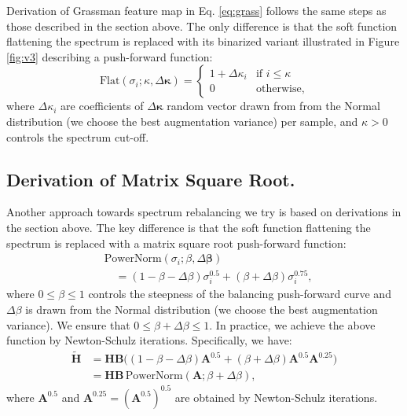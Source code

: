 Derivation of Grassman feature map in Eq. \eqref{eq:grass} follows the same steps as those described in the  section above. The only difference is that the soft function flattening the spectrum is replaced with its  binarized variant illustrated in Figure \ref{fig:v3} describing a push-forward function:
\begin{equation}
  \text{Flat}(\sigma_i; \kappa, \Delta\boldsymbol{\kappa})=
    \begin{cases}
      1+\Delta\kappa_i & \text{if $i\leq\kappa$}\\
      0 & \text{otherwise},
    \end{cases}
\end{equation}
%
where $\Delta\kappa_i$ are coefficients of $\Delta\boldsymbol{\kappa}$ random vector drawn from from the Normal distribution (we choose the best augmentation variance) per sample, and $\kappa>0$ controls the spectrum cut-off.
%



\subsection{Derivation of Matrix Square Root.}
\label{sec:pnnoise}
Another approach towards spectrum rebalancing we try is based on derivations in the   section above. The key difference is that the soft function flattening the spectrum is replaced with a matrix square root push-forward function:
\begin{align}
  &\text{PowerNorm}(\sigma_i; \beta, \Delta\boldsymbol{\beta})\nonumber\\
  &\quad=(1-\beta-\Delta{\beta})\sigma_i^{0.5}+(\beta+\Delta{\beta})\sigma_i^{0.75},
\end{align}
%
where $0\leq\beta\leq 1$ controls the steepness of the balancing push-forward curve and $\Delta{\beta}$ is %
drawn from the Normal distribution (we choose the best augmentation variance). %
We ensure that $0\leq\beta+\Delta{\beta}\leq 1$. %
In practice, we achieve the above function by Newton-Schulz iterations. Specifically, we have:
%
\begin{align}
\!\!\!\!\widetilde{\mathbf{H}}&=\mathbf{H}\mathbf{B}\big( (1-\beta\!-\!\Delta{\beta})\mathbf{A}^{0.5} +(\beta\!+\!\Delta{\beta})\mathbf{A}^{0.5}\mathbf{A}^{0.25}\big)\nonumber\\
&=\mathbf{H}\mathbf{B}\,\text{PowerNorm}(\mathbf{A}; \beta\!+\!\Delta{\beta}),
\end{align}
%
where $\mathbf{A}^{0.5}$ and $\mathbf{A}^{0.25}=\left(\mathbf{A}^{0.5}\right)^{0.5}$  are obtained by Newton-Schulz iterations.


